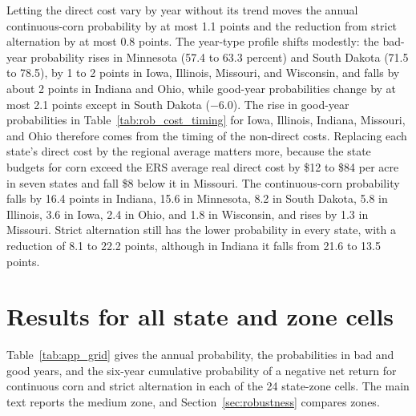 \documentclass[11pt,letterpaper]{article}
\theoremstyle{remark}
\begin{document}
Letting the direct cost vary by year without its trend moves the annual continuous-corn probability by at most 1.1 points and the reduction from strict alternation by at most 0.8 points. The year-type profile shifts modestly: the bad-year probability rises in Minnesota (57.4 to 63.3 percent) and South Dakota (71.5 to 78.5), by 1 to 2 points in Iowa, Illinois, Missouri, and Wisconsin, and falls by about 2 points in Indiana and Ohio, while good-year probabilities change by at most 2.1 points except in South Dakota ($-6.0$). The rise in good-year probabilities in Table~\ref{tab:rob_cost_timing} for Iowa, Illinois, Indiana, Missouri, and Ohio therefore comes from the timing of the non-direct costs. Replacing each state's direct cost by the regional average matters more, because the state budgets for corn exceed the ERS average real direct cost by \$12 to \$84 per acre in seven states and fall \$8 below it in Missouri. The continuous-corn probability falls by 16.4 points in Indiana, 15.6 in Minnesota, 8.2 in South Dakota, 5.8 in Illinois, 3.6 in Iowa, 2.4 in Ohio, and 1.8 in Wisconsin, and rises by 1.3 in Missouri. Strict alternation still has the lower probability in every state, with a reduction of 8.1 to 22.2 points, although in Indiana it falls from 21.6 to 13.5 points.

\section{\label{sec:appendix_C}Results for all state and zone cells}

Table~\ref{tab:app_grid} gives the annual probability, the probabilities in bad and good years, and the six-year cumulative probability of a negative net return for continuous corn and strict alternation in each of the 24 state-zone cells. The main text reports the medium zone, and Section~\ref{sec:robustness} compares zones.

\begin{table}[H]
\centering
\caption{Breakeven probability by state and NCCPI zone (percent). Annual is the probability that revenue falls short of cost in a year; Bad and Good are the same probability in bad and good years; Six-year is the probability that the six-year sum of net return is negative.}
\label{tab:app_grid}
\footnotesize
\setlength{\tabcolsep}{5pt}

\end{table}

\clearpage


\end{document}
